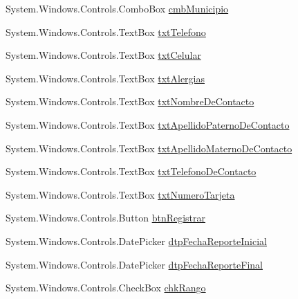 \begin{DoxyCompactItemize}
System.\-Windows.\-Controls.\-Combo\-Box \hyperlink{class_proyecto___integrador__3_1_1_main_window_a6fad73b5f18398cb423384f61d36ff9a}{cmb\-Municipio}
\item 
System.\-Windows.\-Controls.\-Text\-Box \hyperlink{class_proyecto___integrador__3_1_1_main_window_a3d79de440d7968c622d331dd467c8987}{txt\-Telefono}
\item 
System.\-Windows.\-Controls.\-Text\-Box \hyperlink{class_proyecto___integrador__3_1_1_main_window_ac9cc63316a297453b50f4b8704503109}{txt\-Celular}
\item 
System.\-Windows.\-Controls.\-Text\-Box \hyperlink{class_proyecto___integrador__3_1_1_main_window_a4aae2b3a933df894d92ec27f865332e9}{txt\-Alergias}
\item 
System.\-Windows.\-Controls.\-Text\-Box \hyperlink{class_proyecto___integrador__3_1_1_main_window_afe7d51ab07d58ba85a31a58fce6f7d34}{txt\-Nombre\-De\-Contacto}
\item 
System.\-Windows.\-Controls.\-Text\-Box \hyperlink{class_proyecto___integrador__3_1_1_main_window_ad353fe2247d841495434638ca24cf97c}{txt\-Apellido\-Paterno\-De\-Contacto}
\item 
System.\-Windows.\-Controls.\-Text\-Box \hyperlink{class_proyecto___integrador__3_1_1_main_window_a3fc9dd11451712b3345df9f7a471d9b7}{txt\-Apellido\-Materno\-De\-Contacto}
\item 
System.\-Windows.\-Controls.\-Text\-Box \hyperlink{class_proyecto___integrador__3_1_1_main_window_a0103b8eb21ee11204623d0f08a6acdaf}{txt\-Telefono\-De\-Contacto}
\item 
System.\-Windows.\-Controls.\-Text\-Box \hyperlink{class_proyecto___integrador__3_1_1_main_window_aa002c65e1d03d58932cae92c7523198a}{txt\-Numero\-Tarjeta}
\item 
System.\-Windows.\-Controls.\-Button \hyperlink{class_proyecto___integrador__3_1_1_main_window_ac1b64fa55a6742a8f529987bfd452c80}{btn\-Registrar}
\item 
System.\-Windows.\-Controls.\-Date\-Picker \hyperlink{class_proyecto___integrador__3_1_1_main_window_a44bbca638bf885c2bcc23fcfd2d605ac}{dtp\-Fecha\-Reporte\-Inicial}
\item 
System.\-Windows.\-Controls.\-Date\-Picker \hyperlink{class_proyecto___integrador__3_1_1_main_window_a19406fef8f65f2f4b8465a1581b6fa2d}{dtp\-Fecha\-Reporte\-Final}
\item 
System.\-Windows.\-Controls.\-Check\-Box \hyperlink{class_proyecto___integrador__3_1_1_main_window_a2ff6c258d8e7c249c15fbb0fc627f0d8}{chk\-Rango}
\item 

\end{DoxyCompactItemize}
